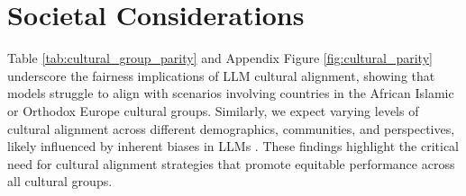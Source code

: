 \section{Societal Considerations}
Table \ref{tab:cultural_group_parity} and Appendix Figure \ref{fig:cultural_parity} underscore the fairness implications of LLM cultural alignment, showing that models struggle to align with scenarios involving countries in the African Islamic or Orthodox Europe cultural groups. Similarly, we expect varying levels of cultural alignment across different demographics, communities, and perspectives, likely influenced by inherent biases in LLMs \cite{blodgett2020language, bender2021dangers, bai2024measuringimplicitbiasexplicitly}. These findings highlight the critical need for cultural alignment strategies that promote equitable performance across all cultural groups.
